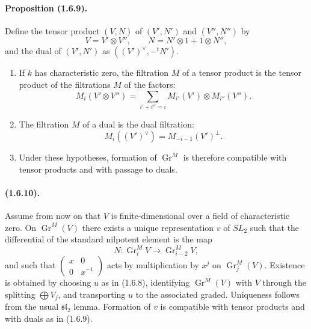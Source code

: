 \documentclass[11pt]{article}
\theoremstyle{remark}
\newcommand{\Gr}{\operatorname{Gr}}
\begin{document}
\paragraph{Proposition (1.6.9).} Define the tensor product $(V,N)$ of $(V',N')$ and $(V'',N'')$ by
\[
        V=V'\otimes V'',\qquad
        N=N'\otimes1+1\otimes N'',
\]
and the dual of $(V',N')$ as $((V')^\vee,-{}^tN')$.
\begin{enumerate}[label=(\roman*)]
\item If $k$ has characteristic zero, the filtration $M$ of a tensor product is the tensor product of the filtrations $M$ of the factors:
\[
        M_i(V'\otimes V'')=
        \sum_{i'+i''=i} M_{i'}(V')\otimes M_{i''}(V'').
\]
\item The filtration $M$ of a dual is the dual filtration:
\[
        M_i((V')^\vee)=M_{-i-1}(V')^\perp.
\]
\item Under these hypotheses, formation of $\Gr^M$ is therefore compatible with tensor products and with passage to duals.
\end{enumerate}

\paragraph{(1.6.10).} Assume from now on that $V$ is finite-dimensional over a field of characteristic zero. On $\Gr^M(V)$ there exists a unique representation $v$ of $SL_2$ such that the differential of the standard nilpotent element is the map
\[
        N:\Gr^M_iV\longrightarrow \Gr^M_{i-2}V,
\]
and such that $\begin{pmatrix}x&0\\0&x^{-1}\end{pmatrix}$ acts by multiplication by $x^j$ on $\Gr^M_j(V)$. Existence is obtained by choosing $u$ as in (1.6.8), identifying $\Gr^M(V)$ with $V$ through the splitting $\bigoplus V_j$, and transporting $u$ to the associated graded. Uniqueness follows from the usual $\mathfrak{sl}_2$ lemma. Formation of $v$ is compatible with tensor products and with duals as in (1.6.9).
\end{document}
